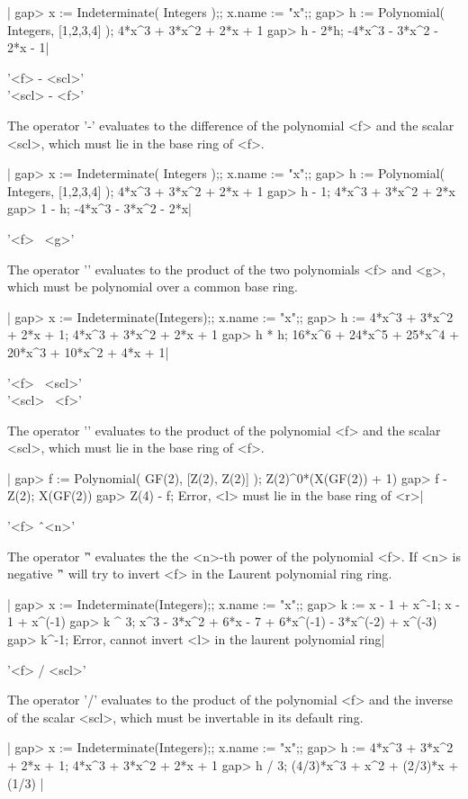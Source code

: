 |    gap> x := Indeterminate( Integers );; x.name := "x";;
    gap> h := Polynomial( Integers, [1,2,3,4] );
    4*x^3 + 3*x^2 + 2*x + 1
    gap> h - 2*h;
    -4*x^3 - 3*x^2 - 2*x - 1|

'<f> - <scl>' \\
'<scl> - <f>'

The operator '-' evaluates  to the difference of  the  polynomial <f> and
the scalar <scl>, which must lie in the base ring of <f>.


|    gap> x := Indeterminate( Integers );; x.name := "x";;
    gap> h := Polynomial( Integers, [1,2,3,4] );
    4*x^3 + 3*x^2 + 2*x + 1
    gap> h - 1;
    4*x^3 + 3*x^2 + 2*x
    gap> 1 - h;
    -4*x^3 - 3*x^2 - 2*x|

'<f> \*\ <g>'

The operator '\*' evaluates to the product of the two polynomials <f> and
<g>, which must be polynomial over a common base ring.

|    gap> x := Indeterminate(Integers);; x.name := "x";;
    gap> h := 4*x^3 + 3*x^2 + 2*x + 1;
    4*x^3 + 3*x^2 + 2*x + 1
    gap> h * h;
    16*x^6 + 24*x^5 + 25*x^4 + 20*x^3 + 10*x^2 + 4*x + 1|

'<f> \*\ <scl>' \\
'<scl> \*\ <f>'

The operator '\*' evaluates to the product of the polynomial <f>  and the
scalar <scl>, which must lie in the base ring of <f>.

|    gap> f := Polynomial( GF(2), [Z(2), Z(2)] );
    Z(2)^0*(X(GF(2)) + 1)
    gap> f - Z(2);
    X(GF(2))
    gap> Z(4) - f;
    Error, <l> must lie in the base ring of <r>|

'<f> \^\ <n>'

The operator '\^' evaluates the the <n>-th power  of the  polynomial <f>.
If <n> is negative '\^'  will try to invert <f> in the Laurent polynomial
ring ring.

|    gap> x := Indeterminate(Integers);; x.name := "x";;
    gap> k := x - 1 + x^-1;
    x - 1 + x^(-1)
    gap> k ^ 3;
    x^3 - 3*x^2 + 6*x - 7 + 6*x^(-1) - 3*x^(-2) + x^(-3)
    gap> k^-1;
    Error, cannot invert <l> in the laurent polynomial ring|

'<f> / <scl>'

The operator  '/' evaluates to  the product of the polynomial <f> and the
inverse  of the scalar  <scl>, which  must be  invertable in  its default
ring.

|    gap> x := Indeterminate(Integers);; x.name := "x";;
    gap> h := 4*x^3 + 3*x^2 + 2*x + 1;
    4*x^3 + 3*x^2 + 2*x + 1
    gap> h / 3;
    (4/3)*x^3 + x^2 + (2/3)*x + (1/3) |

